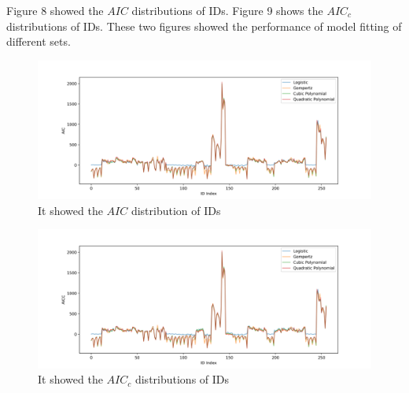 \documentclass[11pt]{article}
\begin{document}
    Figure 8 showed the $AIC$ distributions of IDs. Figure 9 shows the $AIC_c$ distributions of IDs. 
    These two figures showed the performance of model fitting of different sets.

    \begin{figure}[H]
      \centering
      \includegraphics[width=\textwidth]{../results/ID_AIC_distribution.png}
      \caption{It showed the $AIC$ distribution of IDs}
    \end{figure}

    \begin{figure}[H]
      \centering
      \includegraphics[width=\textwidth]{../results/ID_AICC_distribution.png}
      \caption{It showed the $AIC_c$ distributions of IDs}
    \end{figure}

    

\newpage
\end{document}
